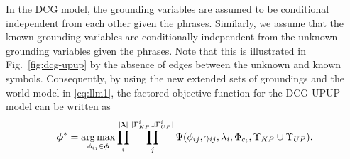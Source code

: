 In the DCG model, the grounding variables are assumed to be conditional independent from each other given the phrases. Similarly, we assume that the known grounding variables are conditionally independent from the unknown grounding variables given the phrases. Note that this is illustrated in Fig.~\ref{fig:dcg-upup} by the absence of edges between the unknown and known symbols. Consequently, by using the new extended sets of groundings and the world model in \eqref{eq:llm1}, the factored  objective function for the DCG-UPUP model can be written as
\begin{equation}
\boldsymbol{\phi}^* = \operatorname*{\arg\max}_{\phi_{ij} \in \boldsymbol{\phi}} \prod_{i}^{|\boldsymbol\lambda|} \prod_{j}^{|\Gamma^i_{KP} \cup \Gamma^i_{UP}|} \Psi(\phi_{ij},\gamma_{ij},\lambda_i, \Phi_{c_{i}},\Upsilon_{KP} \cup \Upsilon_{UP}).
\label{eq:dcg_upup_llm1}
\end{equation}

